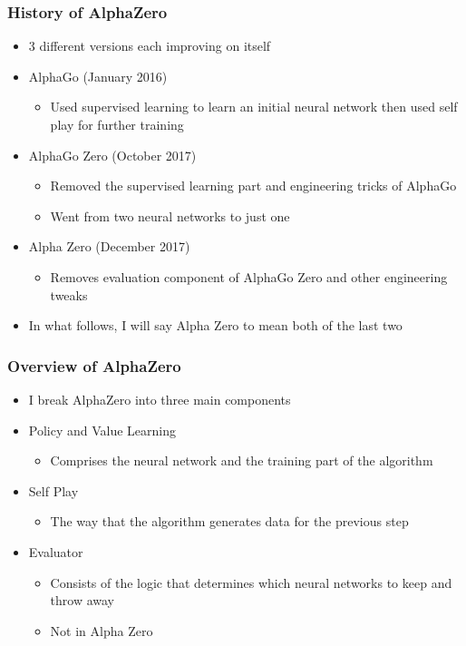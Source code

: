 \documentclass{beamer}
\begin{document}
\begin{frame}
  \frametitle{History of AlphaZero}

  \begin{itemize}
    \item 3 different versions each improving on itself
    \item AlphaGo (January 2016)
      \begin{itemize}
        \item Used supervised learning to learn an initial neural network then used self play for further training
      \end{itemize}
    \item AlphaGo Zero (October 2017)
      \begin{itemize}
        \item Removed the supervised learning part and engineering tricks of AlphaGo
        \item Went from two neural networks to just one
      \end{itemize}
    \item Alpha Zero (December 2017)
      \begin{itemize}
        \item Removes evaluation component of AlphaGo Zero and other engineering tweaks
      \end{itemize}
    \item In what follows, I will say Alpha Zero to mean both of the last two
  \end{itemize}
\end{frame}



\begin{frame}
  \frametitle{Overview of AlphaZero}

  \begin{itemize}
    \item I break AlphaZero into three main components
    \item Policy and Value Learning
      \begin{itemize}
        \item Comprises the neural network and the training part of the algorithm
      \end{itemize}
    \item Self Play
      \begin{itemize}
        \item The way that the algorithm generates data for the previous step
      \end{itemize}
    \item Evaluator
      \begin{itemize}
        \item Consists of the logic that determines which neural networks to keep and throw away
        \item Not in Alpha Zero
      \end{itemize}
  \end{itemize}
\end{frame}
\end{document}
